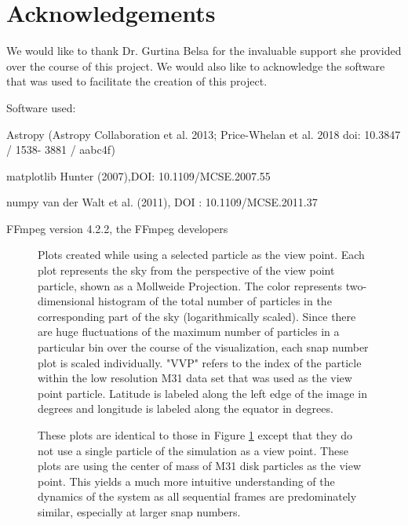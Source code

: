 \documentclass[twocolumn]{aastex63}
\begin{document}
\section{Acknowledgements} \label{sec:style}
We would like to thank Dr. Gurtina Belsa for the invaluable support she provided over the course of this project. We would also like to acknowledge the software that was used to facilitate the creation of this project.


Software used:

\vspace{5mm}
Astropy (Astropy Collaboration et al. 2013; Price-Whelan et al. 2018 doi: 10.3847 / 1538- 3881 / aabc4f)

matplotlib Hunter (2007),DOI: 10.1109/MCSE.2007.55

numpy van der Walt et al. (2011), DOI : 10.1109/MCSE.2011.37

FFmpeg version 4.2.2, the FFmpeg developers


\begin{figure}[p]
\caption{Plots created while using a selected particle as the view point. Each plot represents the sky from the perspective of the view point particle, shown as a Mollweide Projection. The color represents two-dimensional histogram of the total number of particles in the corresponding part of the sky (logarithmically scaled). Since there are huge fluctuations of the maximum number of particles in a particular bin over the course of the visualization, each snap number plot is scaled individually. "VVP" refers to the index of the particle within the low resolution M31 data set that was used as the view point particle. Latitude is labeled along the left edge of the image in degrees and longitude is labeled along the equator in degrees.}
\label{fig:confusing}
\end{figure}


\begin{figure}[p]
\caption{These plots are identical to those in Figure \ref{fig:confusing} except that they do not use a single particle of the simulation as a view point. These plots are using the center of mass of M31 disk particles as the view point. This yields a much more intuitive understanding of the dynamics of the system as all sequential frames are predominately similar, especially at larger snap numbers. }
\label{fig:easy}
\end{figure}
\end{document}

